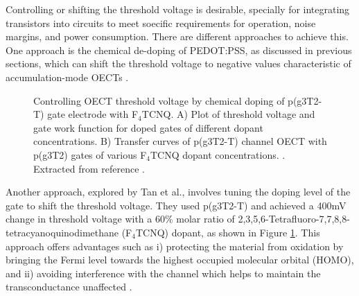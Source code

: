 Controlling or shifting the threshold voltage is desirable, specially for integrating transistors into circuits to meet soecific requirements for operation, noise margins, and power consumption. There are different approaches to achieve this. One approach is the chemical de-doping of PEDOT:PSS, as discussed in previous sections, which can shift the threshold voltage to negative values characteristic of accumulation-mode OECTs \cite{keeneEnhancementModePEDOTPSS2020}. 
 \begin{figure}[h]
	\centering
	\hspace{2em}
	\caption[Tuning of threshold voltage with different levels of doping p(g3T2-T)]{Controlling OECT threshold voltage by chemical doping of p(g3T2-T) gate electrode with F$_{4}$TCNQ. A) Plot of threshold voltage and gate work function for doped gates of different dopant concentrations. B) Transfer curves of p(g3T2-T) channel OECT %
	with p(g3T2) gates of various F$_{4}$TCNQ dopant concentrations. . Extracted from reference \cite{tanTuningOrganicElectrochemical2022}.}
	\label{fig:tune}
\end{figure}

Another approach, explored by Tan et al., involves tuning the doping level of the gate to shift the threshold voltage. They used p(g3T2-T) and achieved a 400mV change in threshold voltage with a 60\% molar ratio of 2,3,5,6-Tetrafluoro-7,7,8,8-tetracyanoquinodimethane (F$_{4}$TCNQ) dopant, as shown in Figure \ref{fig:tune}. This approach offers advantages such as i) protecting the material from oxidation by bringing the Fermi level towards the highest occupied molecular orbital (HOMO), and ii) avoiding interference with the channel which helps to maintain the transconductance unaffected \cite{tanTuningOrganicElectrochemical2022}.


